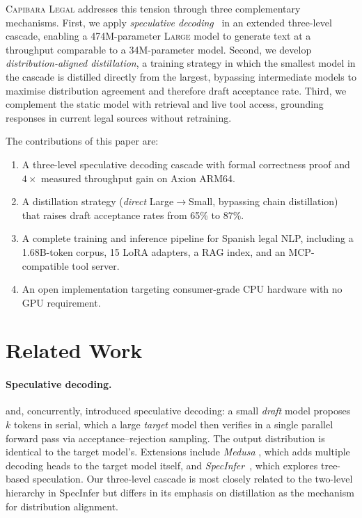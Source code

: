 \documentclass[11pt,a4paper]{article}
\newcommand{\modelname}{\textsc{Capibara Legal}}
\begin{document}
\modelname{} addresses this tension through three complementary mechanisms.
First, we apply \emph{speculative decoding}~\citep{leviathan2023fast} in an
extended three-level cascade, enabling a 474M-parameter \textsc{Large} model to
generate text at a throughput comparable to a 34M-parameter model. Second, we
develop \emph{distribution-aligned distillation}, a training strategy in which
the smallest model in the cascade is distilled directly from the largest,
bypassing intermediate models to maximise distribution agreement and therefore
draft acceptance rate. Third, we complement the static model with retrieval
and live tool access, grounding responses in current legal sources without
retraining.

The contributions of this paper are:
\begin{enumerate}[noitemsep]
  \item A three-level speculative decoding cascade with formal correctness proof
        and $4\times$ measured throughput gain on Axion ARM64.
  \item A distillation strategy (\emph{direct} Large$\to$Small, bypassing chain
        distillation) that raises draft acceptance rates from 65\% to 87\%.
  \item A complete training and inference pipeline for Spanish legal NLP,
        including a 1.68B-token corpus, 15 LoRA adapters, a RAG index, and an
        MCP-compatible tool server.
  \item An open implementation targeting consumer-grade CPU hardware with no
        GPU requirement.
\end{enumerate}

\section{Related Work}

\paragraph{Speculative decoding.}
\citet{leviathan2023fast} and, concurrently, \citet{chen2023accelerating}
introduced speculative decoding: a small \emph{draft} model proposes $k$ tokens
in serial, which a large \emph{target} model then verifies in a single parallel
forward pass via acceptance--rejection sampling. The output distribution is
identical to the target model's. Extensions include \emph{Medusa}
\citep{cai2024medusa}, which adds multiple decoding heads to the target model
itself, and \emph{SpecInfer}~\citep{miao2024specinfer}, which explores
tree-based speculation. Our three-level cascade is most closely related to the
two-level hierarchy in SpecInfer but differs in its emphasis on distillation
as the mechanism for distribution alignment.
\end{document}

